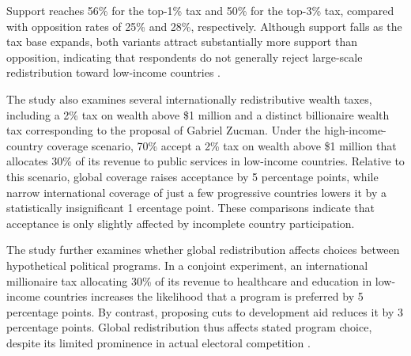 \documentclass[11pt,a4paper]{article}
\begin{document}
Support reaches 56\% for the top-1\% tax and 50\% for the top-3\% tax, compared with opposition rates of 25\% and 28\%, respectively. Although support falls as the tax base expands, both variants attract substantially more support than opposition, indicating that respondents do not generally reject large-scale redistribution toward low-income countries \citep{fabre_public_2026}. %

The study also examines several internationally redistributive wealth taxes, including a 2\% tax on wealth above \$1 million and a distinct billionaire wealth tax corresponding %
to the proposal of %
Gabriel Zucman. %
Under the high-income-country coverage scenario, %
70\% accept a 2\% tax on wealth above \$1 million that allocates 30\% of its revenue to public services in low-income countries. Relative to this scenario, global coverage raises acceptance by 5 %
percentage points, while narrow %
international coverage of just a few progressive countries 
lowers it by a statistically insignificant 1 %
ercentage point. These comparisons indicate that acceptance is only slightly affected by %
incomplete country participation. %

The study further examines whether global redistribution affects choices between hypothetical political programs. In a conjoint experiment, an international millionaire tax allocating 30\% of its revenue to healthcare and education in low-income countries increases the likelihood that a program is preferred %
by 5 percentage points. By contrast, proposing cuts to development aid reduces it %
by 3 percentage points. Global redistribution thus affects stated program choice, despite its limited prominence in actual electoral competition \citep{fabre_public_2026}. 
\end{document}
